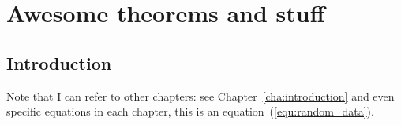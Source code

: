 \chapter{Awesome theorems and stuff}\label{cha:awesome_theorems_and_stuff}

\section{Introduction}

Note that I can refer to other chapters: see Chapter~\ref{cha:introduction} and
even specific equations in each chapter, this is an
equation~(\ref{equ:random_data}).

\lipsum
